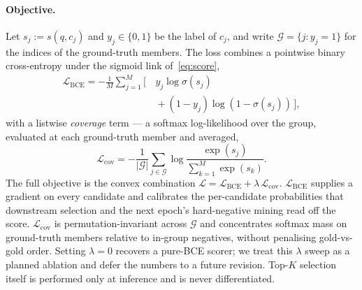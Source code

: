 \paragraph{Objective.}
Let $s_j := s(q, c_j)$ and $y_j \in \{0,1\}$ be the label of
$c_j$, and write $\mathcal{G} = \{j : y_j = 1\}$ for the indices
of the ground-truth members. The loss combines a pointwise binary
cross-entropy under the sigmoid link of~\eqref{eq:score},
\begin{equation}
\begin{aligned}
  \mathcal{L}_{\text{BCE}}
   = -\frac{1}{M}\sum_{j=1}^{M} \bigl[\,
   &y_j \log \sigma(s_j) \\
   &{}+ (1-y_j) \log(1-\sigma(s_j)) \,\bigr],
\end{aligned}
  \label{eq:bce}
\end{equation}
with a listwise \emph{coverage} term --- a softmax log-likelihood
over the group, evaluated at each ground-truth member and averaged,
\begin{equation}
  \mathcal{L}_{\text{cov}}
  = -\frac{1}{|\mathcal{G}|}\sum_{j \in \mathcal{G}}
    \log \frac{\exp(s_j)}{\sum_{k=1}^{M} \exp(s_k)}.
  \label{eq:cov}
\end{equation}
The full objective is the convex combination
$\mathcal{L} = \mathcal{L}_{\text{BCE}} + \lambda\, \mathcal{L}_{\text{cov}}$.
$\mathcal{L}_{\text{BCE}}$ supplies a gradient on every candidate
and calibrates the per-candidate probabilities that downstream
selection and the next epoch's hard-negative mining read off the
score. $\mathcal{L}_{\text{cov}}$ is permutation-invariant across
$\mathcal{G}$ and concentrates softmax mass on ground-truth members
relative to in-group negatives, without penalising gold-vs-gold
order. Setting $\lambda{=}0$ recovers a pure-BCE scorer; we
treat this $\lambda$ sweep as a planned ablation and defer the
numbers to a future revision. Top-$K$ selection itself is
performed only at inference and is never differentiated.
